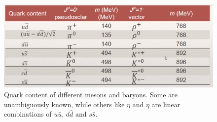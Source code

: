 \begin{figure}[hb!]
\centering
\includegraphics[width = .75\textwidth]{quark_content.png}
\caption{Quark content of different mesons and baryons. Some are unambiguously known, while others like $η$ and $\bar{η}$ are linear combinations of $u \bar{u}$, $d \bar{d}$ and $s \bar{s}$.}
\label{fig: quark_content}
\end{figure}



